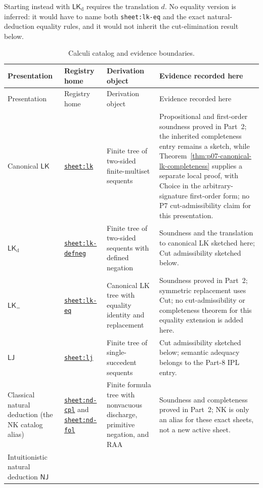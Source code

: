 Starting instead with \(\mathsf{LK}_{\mathrm d}\) requires the translation
\(d\).  No equality version is inferred: it would have to name both
\texttt{sheet:lk-eq} and the exact natural-deduction equality rules, and it
would not inherit the cut-elimination result below.

\begingroup\scriptsize
\begin{longtable}{@{}p{}p{}p{}
  p{}@{}}
\caption{Calculi catalog and evidence boundaries.}
\label{tab:p07-calculi-catalog}\\
\toprule
Presentation & Registry home & Derivation object & Evidence recorded here \\
\midrule
\endfirsthead
\toprule
Presentation & Registry home & Derivation object & Evidence recorded here \\
\midrule
\endhead
Canonical \(\mathsf{LK}\) & \hyperref[sheet:lk]{\texttt{sheet:lk}} & Finite
tree of two-sided finite-multiset sequents & Propositional and first-order
soundness proved in Part~2; the inherited completeness entry remains a sketch,
while Theorem~\ref{thm:p07-canonical-lk-completeness} supplies a separate local
proof, with Choice in the arbitrary-signature first-order form; no P7
cut-admissibility claim for this presentation. \\
\(\mathsf{LK}_{\mathrm d}\) &
\hyperref[sheet:lk-defneg]{\texttt{sheet:lk-defneg}} & Finite tree of
two-sided sequents with defined negation & Soundness and the translation to
canonical LK sketched here; Cut admissibility sketched below. \\
\(\mathsf{LK}_{=}\) & \hyperref[sheet:lk-eq]{\texttt{sheet:lk-eq}} &
Canonical LK tree with equality identity and replacement & Soundness proved
in Part~2; symmetric replacement uses Cut; no cut-admissibility or
completeness theorem for this equality extension is added here. \\
\(\mathsf{LJ}\) & \hyperref[sheet:lj]{\texttt{sheet:lj}} & Finite tree of
single-succedent sequents & Cut admissibility sketched below; semantic
adequacy belongs to the Part-8 IPL entry. \\
Classical natural deduction (the NK catalog alias) &
\hyperref[sheet:nd-cpl]{\texttt{sheet:nd-cpl}} and
\hyperref[sheet:nd-fol]{\texttt{sheet:nd-fol}} & Finite formula tree with
nonvacuous discharge, primitive negation, and RAA & Soundness and
completeness proved in Part~2; NK is only an alias for these exact sheets,
not a new active sheet. \\
Intuitionistic natural deduction \(\mathsf{NJ}\) &

\end{longtable}
